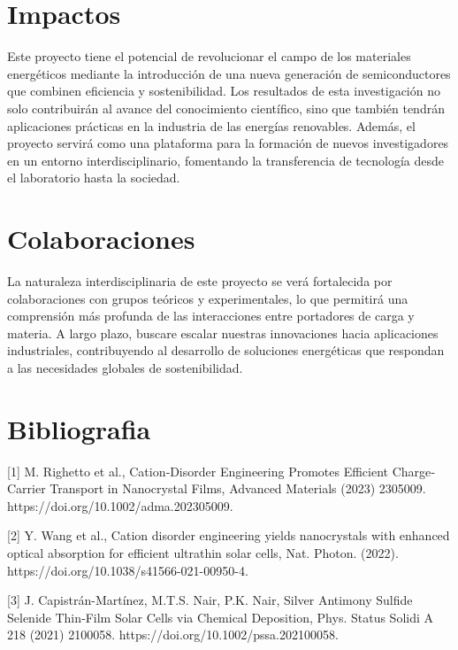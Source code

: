 \documentclass[12pt,letter,spanish]{article}
\begin{document}
\section*{Impactos}

Este proyecto tiene el potencial de revolucionar el campo de los materiales energéticos mediante la introducción de una nueva generación de semiconductores que combinen eficiencia y sostenibilidad. Los resultados de esta investigación no solo contribuirán al avance del conocimiento científico, sino que también tendrán aplicaciones prácticas en la industria de las energías renovables. Además, el proyecto servirá como una plataforma para la formación de nuevos investigadores en un entorno interdisciplinario, fomentando la transferencia de tecnología desde el laboratorio hasta la sociedad.
	
\section*{Colaboraciones}

La naturaleza interdisciplinaria de este proyecto se verá fortalecida por colaboraciones con grupos teóricos y experimentales, lo que permitirá una comprensión más profunda de las interacciones entre portadores de carga y materia. A largo plazo, buscare escalar nuestras innovaciones hacia aplicaciones industriales, contribuyendo al desarrollo de soluciones energéticas que respondan a las necesidades globales de sostenibilidad.

\section*{Bibliografia}

[1] M. Righetto et al., Cation‐Disorder Engineering Promotes Efficient Charge‐Carrier Transport in  Nanocrystal Films, Advanced Materials (2023) 2305009. https://doi.org/10.1002/adma.202305009.

[2] Y. Wang et al., Cation disorder engineering yields  nanocrystals with enhanced optical absorption for efficient ultrathin solar cells, Nat. Photon. (2022). https://doi.org/10.1038/s41566-021-00950-4.

[3] J. Capistrán-Martínez, M.T.S. Nair, P.K. Nair, Silver Antimony Sulfide Selenide Thin‐Film Solar Cells via Chemical Deposition, Phys. Status Solidi A 218 (2021) 2100058. https://doi.org/10.1002/pssa.202100058.







\end{document}
